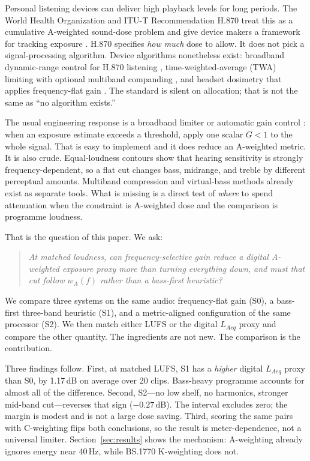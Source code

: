 \documentclass[12pt,journal,onecolumn]{IEEEtran}
\begin{document}
Personal listening devices can deliver high playback levels for long periods. The World Health Organization and ITU-T Recommendation H.870 treat this as a cumulative A-weighted sound-dose problem and give device makers a framework for tracking exposure \cite{H870,WHO2021,Levey2011,Portnuff2011}. H.870 specifies \emph{how much} dose to allow. It does not pick a signal-processing algorithm. Device algorithms nonetheless exist: broadband dynamic-range control for H.870 listening \cite{Chen2023}, time-weighted-average (TWA) limiting with optional multiband companding \cite{US9980028}, and headset dosimetry that applies frequency-flat gain \cite{US6826515}. The standard is silent on allocation; that is not the same as ``no algorithm exists.''

The usual engineering response is a broadband limiter or automatic gain control \cite{Giannoulis2012}: when an exposure estimate exceeds a threshold, apply one scalar $G<1$ to the whole signal. That is easy to implement and it does reduce an A-weighted metric. It is also crude. Equal-loudness contours \cite{FletcherMunson1933,ISO226} show that hearing sensitivity is strongly frequency-dependent, so a flat cut changes bass, midrange, and treble by different perceptual amounts. Multiband compression and virtual-bass methods already exist as separate tools. What is missing is a direct test of \emph{where} to spend attenuation when the constraint is A-weighted dose and the comparison is programme loudness.

That is the question of this paper. We ask:

\begin{quote}
\textit{At matched loudness, can frequency-selective gain reduce a digital A-weighted exposure proxy more than turning everything down, and must that cut follow $w_A(f)$ rather than a bass-first heuristic?}
\end{quote}

We compare three systems on the same audio: frequency-flat gain (S0), a bass-first three-band heuristic (S1), and a metric-aligned configuration of the same processor (S2). We then match either LUFS or the digital $L_{Aeq}$ proxy and compare the other quantity. The ingredients are not new. The comparison is the contribution.

Three findings follow. First, at matched LUFS, S1 has a \emph{higher} digital $L_{Aeq}$ proxy than S0, by 1.17\,dB on average over 20 clips. Bass-heavy programme accounts for almost all of the difference. Second, S2---no low shelf, no harmonics, stronger mid-band cut---reverses that sign ($-0.27$\,dB). The interval excludes zero; the margin is modest and is not a large dose saving. Third, scoring the same pairs with C-weighting flips both conclusions, so the result is meter-dependence, not a universal limiter. Section~\ref{sec:results} shows the mechanism: A-weighting already ignores energy near 40\,Hz, while BS.1770 K-weighting does not.
\end{document}
